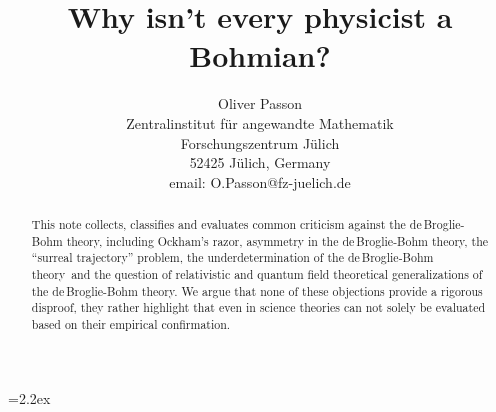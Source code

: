
\topmargin=-1cm
\oddsidemargin=0cm
\textwidth=16cm
\textheight=24cm
\textfloatsep=2.2ex

%
%  
%  
%
%
%
\newcommand{\db}{de$\,$Broglie}
\newcommand{\dbb}{de$\,$Broglie-Bohm theory}
\newcommand{\qeh}{quantum equilibrium hypothesis}
\newcommand{\qm}{quantum mechanics}


\title{Why isn't every physicist a Bohmian?}
\author{Oliver Passon\\
Zentralinstitut f\"ur angewandte Mathematik\\
Forschungszentrum J\"ulich\\
52425 J\"ulich, Germany\\
email: O.Passon@fz-juelich.de }
\begin{abstract}
This note collects, classifies and evaluates common criticism against the \dbb, including Ockham's razor, asymmetry in the \dbb, 
the ``surreal trajectory'' problem, the underdetermination of the \dbb\ and the question of relativistic and quantum field theoretical
generalizations of the \dbb. We argue that none of these objections provide a rigorous disproof, they rather highlight
that even in science theories can not solely be evaluated based on their empirical confirmation. 
\end{abstract}
\maketitle

